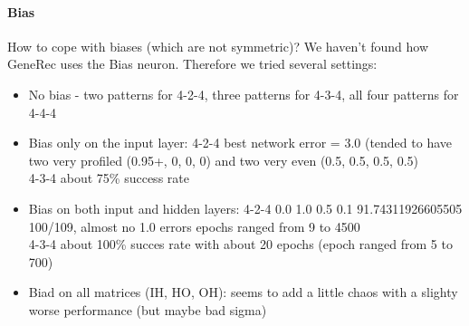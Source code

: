 \paragraph{Bias} 
How to cope with biases (which are not symmetric)? We haven't found how GeneRec uses the Bias neuron. Therefore we tried several settings: 
\begin{itemize} 
\item No bias - two patterns for 4-2-4, three patterns for 4-3-4, all four patterns for 4-4-4
\item Bias only on the input layer:  
4-2-4 best network error = 3.0 (tended to have two very profiled (0.95+, 0, 0, 0) and two very even (0.5, 0.5, 0.5, 0.5)  \\
4-3-4 about 75\% success rate 
\item Bias on both input and hidden layers: 
    4-2-4 0.0 1.0 0.5 0.1 91.74311926605505 100/109, almost no 1.0 errors 
          epochs ranged from 9 to 4500 \\ 
    4-3-4 about 100\% succes rate with about 20 epochs (epoch ranged from 5 to 700) 
\item Biad on all matrices (IH, HO, OH): 
    seems to add a little chaos with a slighty worse performance (but maybe bad sigma)

\end{itemize} 

